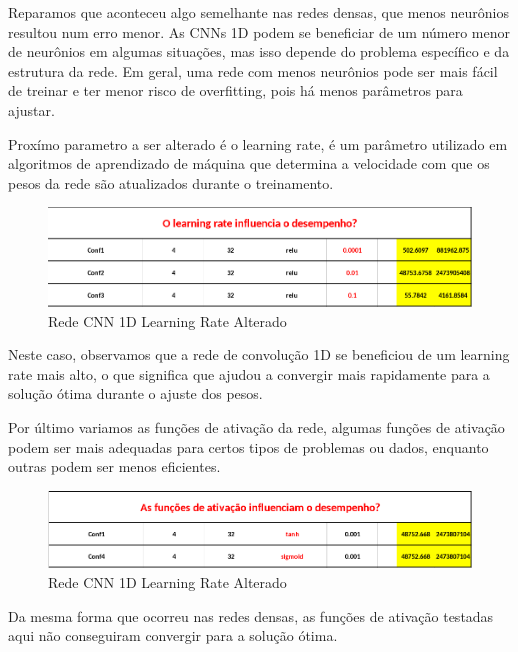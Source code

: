 \documentclass[10pt]{article}
\begin{document}
Reparamos que aconteceu algo semelhante nas redes densas, que menos neurônios
resultou num erro menor. As CNNs 1D podem se beneficiar de um número menor 
de neurônios em algumas situações, mas isso depende do problema específico 
e da estrutura da rede. Em geral, uma rede com menos neurônios pode ser mais 
fácil de treinar e ter menor risco de overfitting, pois há menos parâmetros 
para ajustar.

\vspace{1cm}
Proxímo parametro a ser alterado é o learning rate, é um parâmetro utilizado 
em algoritmos de aprendizado de máquina que determina a velocidade com que 
os pesos da rede são atualizados durante o treinamento.

\begin{figure}[htb]
  \centering
  \includegraphics[width=\linewidth]{img/cnn_lr.png}
  \caption{Rede CNN 1D Learning Rate Alterado}
  \label{fig:cnn_lr}
\end{figure}

Neste caso, observamos que a rede de convolução 1D se beneficiou de um 
learning rate mais alto, o que significa que ajudou a convergir mais 
rapidamente para a solução ótima durante o ajuste dos pesos.

\newpage
Por último variamos as funções de ativação da rede, algumas funções de 
ativação podem ser mais adequadas para certos tipos de problemas ou dados, 
enquanto outras podem ser menos eficientes.

\begin{figure}[htb]
  \centering
  \includegraphics[width=\linewidth]{img/cnn_ativacao.png}
  \caption{Rede CNN 1D Learning Rate Alterado}
  \label{fig:cnn_ativacao}
\end{figure}

Da mesma forma que ocorreu nas redes densas, as funções de ativação testadas aqui não 
conseguiram convergir para a solução ótima.
\end{document}
